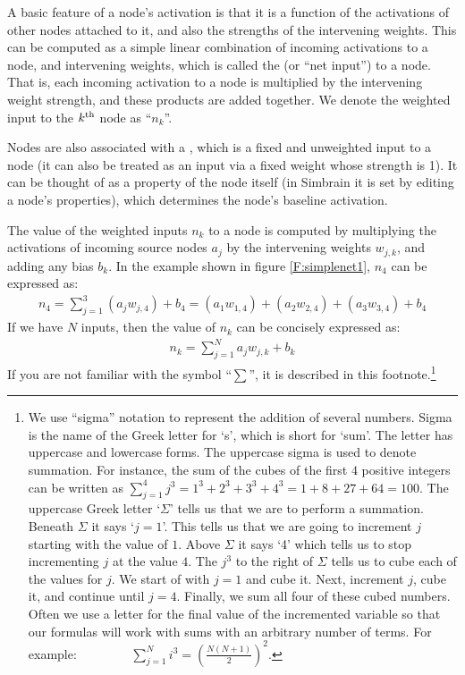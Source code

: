 
A basic feature of a node's activation is that it is a function of the activations of other nodes attached to it, and also the strengths of the intervening weights. This can be computed as a simple linear combination of incoming activations to a node, and intervening weights, which is called the   (or ``net input'') to a node. That is, each incoming activation to a node is multiplied by the intervening weight strength, and these products are added together. We denote the weighted input to the $k^{\rm th}$ node as ``$n_k$''. 

Nodes are also associated with a , which is a fixed and unweighted input to a node (it can also be treated as an input via a fixed weight whose strength is 1). It can be thought of as a property of the node itself (in Simbrain it is set by editing a node's properties), which determines the node's baseline activation.

The value of the weighted inputs $n_k$ to a node is computed by multiplying the activations of incoming 
source nodes $a_j$ by the intervening weights $w_{j,k}$, and adding any bias $b_k$.
In the example shown in figure \ref{F:simplenet1},  $n_4$ can be expressed as:
\begin{eqnarray*}
n_4 = \sum_{j=1}^{3} (a_j w_{j,4})  + b_4 = (a_1 w_{1,4})  + (a_2 w_{2,4}) + 
(a_3 w_{3,4}) + b_4
\end{eqnarray*}
If we have $N$ inputs, then the value 
of $n_k$ can be concisely expressed as:
\begin{eqnarray*}
n_k = \sum_{j=1}^{N} a_j w_{j,k}  + b_k
\end{eqnarray*}
If you are not familiar with the symbol ``$\sum$'', it is described in this footnote.\footnote{We use ``sigma'' notation to represent the 
addition of several numbers. Sigma is the name of the Greek letter for `s', 
which is short for `sum'. The letter has uppercase and lowercase forms. The 
uppercase sigma is used to denote summation. For instance, the sum of the cubes 
of the first $4$ positive integers can be written as 
$\displaystyle{\sum_{j=1}^{4} j^3 = 1^3 + 2^3 + 3^3 + 4^3 = 1 + 8 + 27 + 64 = 
100}$. The uppercase Greek letter `$\Sigma$' tells us that we are to perform a 
summation. Beneath $\Sigma$ it says `$j=1$'. This tells us that we are going 
to increment $j$ starting with the value of $1$. Above $\Sigma$ it says `4' 
which tells us to stop incrementing $j$ at the value $4$. The $j^3$ to the 
right of $\Sigma$ tells us to cube each of the values for $j$. We start of 
with $j=1$ and cube it. Next, increment $j$, cube it, and continue until 
$j=4$. Finally, we sum all four of these cubed numbers. Often we use a 
letter for the final value of the incremented variable so that our formulas 
will work with sums with an arbitrary number of terms. For example: 
$\displaystyle{\qquad \qquad \sum_{j=1}^{N} i^3 = 
\left(\frac{N(N+1)}{2}\right)^2}$.}

